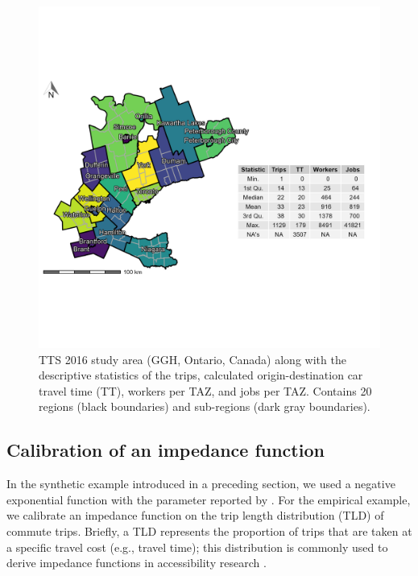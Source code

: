 \documentclass[]{elsarticle} %
\begin{document}
\begin{figure}

{\centering \includegraphics[width=0.8\linewidth]{images/TTS16-survey-area} 

}

\caption{\label{fig:TTS-16-survey-area}TTS 2016 study area (GGH, Ontario, Canada) along with the descriptive statistics of the trips, calculated origin-destination car travel time (TT), workers per TAZ, and jobs per TAZ. Contains 20 regions (black boundaries) and sub-regions (dark gray boundaries).}\label{fig:TTS-16-survey-area}
\end{figure}

\hypertarget{calibration-of-an-impedance-function}{%
\subsection{Calibration of an impedance
function}\label{calibration-of-an-impedance-function}}

In the synthetic example introduced in a preceding section, we used a
negative exponential function with the parameter reported by
\citet{shen1998}. For the empirical example, we calibrate an impedance
function on the trip length distribution (TLD) of commute trips.
Briefly, a TLD represents the proportion of trips that are taken at a
specific travel cost (e.g., travel time); this distribution is commonly
used to derive impedance functions in accessibility research
\citep{lopez_2017_spatial, horbachov_theoretical_2018, batista_estimation_2019}.
\end{document}
